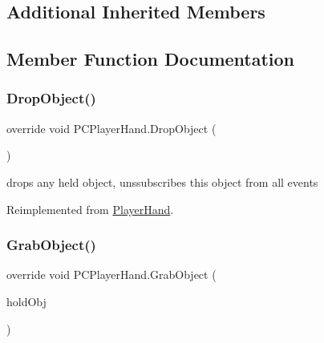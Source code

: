\subsection*{Additional Inherited Members}


\subsection{Member Function Documentation}
\mbox{\label{class_p_c_player_hand_a42c7ffd95f8493901c93e2c1e4576585}} 
\subsubsection{\texorpdfstring{Drop\+Object()}{DropObject()}}
{\footnotesize\ttfamily override void P\+C\+Player\+Hand.\+Drop\+Object (\begin{DoxyParamCaption}{ }\end{DoxyParamCaption})\hspace{0.3cm}{\ttfamily [virtual]}}



drops any held object, unssubscribes this object from all events 



Reimplemented from \mbox{\hyperlink{class_player_hand_a3b127b846b420ef37cba3a3a8de68e78}{Player\+Hand}}.

\mbox{\label{class_p_c_player_hand_a08da28b459501727d269733569559c24}} 
\subsubsection{\texorpdfstring{Grab\+Object()}{GrabObject()}}
{\footnotesize\ttfamily override void P\+C\+Player\+Hand.\+Grab\+Object (\begin{DoxyParamCaption}\item[{\mbox{\hyperlink{interface_i_holdable_object}{I\+Holdable\+Object}}}]{hold\+Obj }\end{DoxyParamCaption})\hspace{0.3cm}{\ttfamily [virtual]}}




